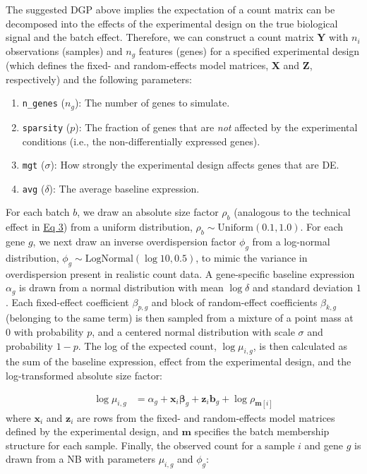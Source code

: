 \documentclass[10pt,letterpaper]{article}
\begin{document}
The suggested DGP above implies the expectation of a count matrix can be decomposed into the effects of the experimental design on the true biological signal and the batch effect.
Therefore, we can construct a count matrix $\boldsymbol{Y}$ with $n_i$ observations (samples) and $n_g$ features (genes) for a specified experimental design (which defines the fixed- and random-effects model matrices, $\boldsymbol{X}$ and $\boldsymbol{Z}$, respectively) and the following parameters:

\begin{enumerate}
	\item \verb|n_genes| ($n_g$): The number of genes to simulate.
	\item \verb|sparsity| ($p$): The fraction of genes that are \textit{not} affected by the experimental conditions (i.e., the non-differentially expressed genes).
	\item \verb|mgt| ($\sigma$): How strongly the experimental design affects genes that are DE.
	\item \verb|avg| ($\delta$): The average baseline expression.
\end{enumerate}

For each batch $b$, we draw an absolute size factor $\rho_b$ (analogous to the technical effect in \hyperref[tech_effect]{Eq 3}) from a uniform distribution, $\rho_b \sim \text{Uniform}(0.1, 1.0)$.
For each gene $g$, we next draw an inverse overdispersion factor $\phi_g$ from a log-normal distribution, $\phi_g \sim \text{LogNormal}(\log 10, 0.5)$, to mimic the variance in overdispersion present in realistic count data.
A gene-specific baseline expression $\alpha_g$ is drawn from a normal distribution with mean $\log \delta$ and standard deviation $1$.
Each fixed-effect coefficient $\beta_{p,g}$ and block of random-effect coefficients $\beta_{k,g}$ (belonging to the same term) is then sampled from a mixture of a point mass at $0$ with probability $p$, and a centered normal distribution with scale $\sigma$ and probability $1 - p$.
The log of the expected count, $\log \mu_{i,g}$, is then calculated as the sum of the baseline expression, effect from the experimental design, and the log-transformed absolute size factor:

\begin{align}
    \log \mu_{i,g} &= \alpha_g + \boldsymbol{x}_i \boldsymbol{\beta}_g + \boldsymbol{z}_i \boldsymbol{b}_g + \log \rho_{\boldsymbol{m}[i]}
\end{align}
where $\boldsymbol{x}_i$ and $\boldsymbol{z}_i$ are rows from the fixed- and random-effects model matrices defined by the experimental design, and $\boldsymbol{m}$ specifies the batch membership structure for each sample.
Finally, the observed count for a sample $i$ and gene $g$ is drawn from a NB with parameters $\mu_{i,g}$ and $\phi_g$:
\end{document}

